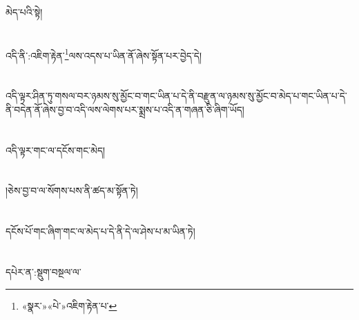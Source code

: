མེད་པའི་སྟེ།\chapter{ }འདི་ནི་:འཇིག་རྟེན་\footnote{«སྣར་»«པེ་»འཇིག་རྟེན་པ་}ལས་འདས་པ་ཡིན་ནོ་ཞེས་སྟོན་པར་བྱེད་དེ།\chapter{ }འདི་ལྟར་ཤིན་ཏུ་གསལ་བར་ཉམས་སུ་མྱོང་བ་གང་ཡིན་པ་དེ་ནི་བརྫུན་ལ་ཉམས་སུ་མྱོང་བ་མེད་པ་གང་ཡིན་པ་དེ་ནི་བདེན་ནོ་ཞེས་བྱ་བ་འདི་ལས་ལེགས་པར་སྨྲས་པ་འདི་ན་གཞན་ཅི་ཞིག་ཡོད།\chapter{ }འདི་ལྟར་གང་ལ་དངོས་གང་མེད།\chapter{ }།ཅེས་བྱ་བ་ལ་སོགས་པས་ནི་ཚད་མ་སྟོན་ཏེ།\chapter{ }དངོས་པོ་གང་ཞིག་གང་ལ་མེད་པ་དེ་ནི་དེ་ལ་ཤེས་པ་མ་ཡིན་ཏེ།\chapter{ }དཔེར་ན་:སྡུག་བསྔལ་ལ་\fo
